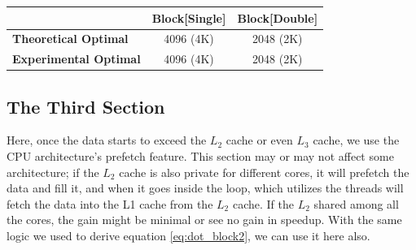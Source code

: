 \begin{figure}[htb]
    \centering
    \label{fig:dot_Stuning_block2}
    \qquad
    \label{fig:dot_Dtuning_block2}
\end{figure}

\begin{table}[ht]
    \centering
    \begin{tabular}{l|c|c|}
        & \textbf{Block[Single]} & \textbf{Block[Double]}\\
        \hline
        \textbf{Theoretical Optimal} & 4096 (4K) & 2048 (2K)\\
        \hline
        \textbf{Experimental Optimal} & 4096 (4K) & 2048 (2K)\\
        \hline
    \end{tabular}
\end{table}

\subsection{The Third Section}

Here, once the data starts to exceed the $L_2$ cache or even $L_3$ cache, 
we use the CPU architecture's prefetch feature. 
This section may or may not affect some architecture; 
if the $L_2$ cache is also private for different cores, 
it will prefetch the data and fill it, and when it goes 
inside the loop, which utilizes the threads will fetch 
the data into the L1 cache from the $L_2$ cache. 
If the $L_2$ shared among all the cores, the gain might be 
minimal or see no gain in speedup. With the same logic 
we used to derive equation \ref{eq:dot_block2}, we can use it here also.

